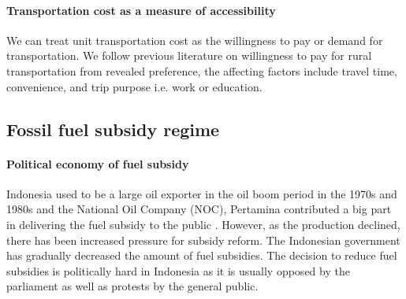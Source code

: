 \documentclass[letterpaper,12pt,leqno]{article}
\begin{document}
\paragraph{Transportation cost as a measure of accessibility} We can treat unit transportation cost as the willingness to pay or demand for transportation. We follow previous literature on willingness to pay for rural transportation from revealed preference, the affecting factors include travel time, convenience, and trip purpose i.e. work or education.



\subsection{Fossil fuel subsidy regime}\label{ss:fuelsubsidy}

\paragraph{Political economy of fuel subsidy} Indonesia used to be a large oil exporter in the oil boom period in the 1970s and 1980s and the National Oil Company (NOC), Pertamina contributed a big part in delivering the fuel subsidy to the public \citep{ichsan_2022}. However, as the production declined, there has been increased pressure for subsidy reform. The Indonesian government has gradually decreased the amount of fuel subsidies. The decision to reduce fuel subsidies is politically hard in Indonesia as it is usually opposed by the parliament as well as protests by the general public.
\end{document}
